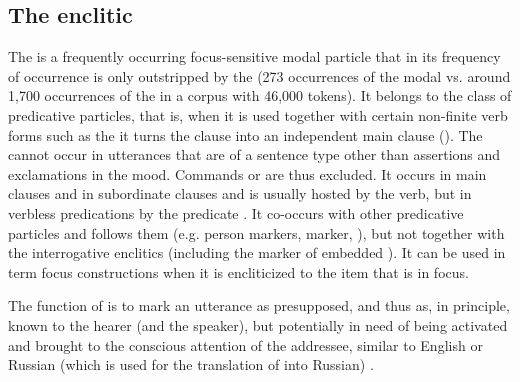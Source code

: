 
\subsection{The enclitic }
\label{ssec:The enclitic =q'al}

The   is a frequently occurring focus-sensitive modal particle that in its frequency of occurrence is only outstripped by the  (273 occurrences of the modal  vs. around 1,700 occurrences of the  in a corpus with 46,000 tokens). It belongs to the class of predicative particles, that is, when it is used together with certain non-finite verb forms such as the  it turns the clause into an independent main clause  (). The  cannot occur in utterances that are of a sentence type other than assertions and exclamations in the  mood. Commands or  are thus excluded. It occurs in main clauses  and in subordinate clauses  and is usually hosted by the verb, but in verbless predications by the predicate . It co-occurs with other predicative particles and follows them (e.g. person markers,  marker, ), but not together with the interrogative enclitics (including the marker of embedded ). It can be used in term focus constructions when it is encliticized to the item that is in focus. 

The function of  is to mark an utterance as presupposed, and thus as, in principle, known to the hearer (and the speaker), but potentially in need of being activated and brought to the conscious attention of the addressee, similar to English  or Russian  (which is used for the translation of  into Russian) .

